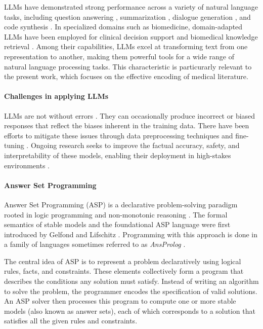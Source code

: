 \documentclass[11pt,leqno]{amsart}
\begin{document}

LLMs have demonstrated strong performance across a variety of natural language tasks, 
including question answering \cite{Brown2020}, summarization \cite{Zhang2020}, 
dialogue generation \cite{Thoppilan2022lamda}, and code synthesis \cite{Chen2021}. 
In specialized domains such as biomedicine, domain-adapted LLMs have been employed 
for clinical decision support \cite{Singhal2023} and 
biomedical knowledge retrieval \cite{Luo2022}.
Among their capabilities, LLMs excel at transforming text from one representation to another, 
making them powerful tools for a wide range of natural language processing tasks. 
This characteristic is particurarly relevant to the present work, 
which focuses on the effective encoding of medical literature. \\

\paragraph{\textbf{Challenges in applying LLMs}}

LLMs are not without errors \cite{Raj2023, Ruis2023}. 
They can occasionally produce incorrect or biased responses 
that reflect the biases inherent in the training data. 
There have been efforts to mitigate these issues 
through data preprocessing techniques and fine-tuning \cite{Dodge2021}.
Ongoing research seeks to improve the factual accuracy, safety, and interpretability 
of these models, enabling their deployment in high-stakes environments \cite{Ganguli2022}. \\

\paragraph{\textbf{Answer Set Programming}}

Answer Set Programming (ASP) \cite{Eiter2009} is a declarative problem-solving paradigm 
rooted in logic programming and non-monotonic reasoning \cite{Brewka2011}. 
The formal semantics of stable models and the foundational ASP language 
were first introduced by Gelfond and Lifschitz \cite{Gelfond2000, gel88}.
Programming with this approach is done in a family of languages 
sometimes referred to as \textit{AnsProlog} \cite{Gelfond2002}.

The central idea of ASP is to represent a problem 
declaratively using logical rules, facts, and constraints. 
These elements collectively form a program that describes the conditions any solution must satisfy. 
Instead of writing an algorithm to solve the problem, 
the programmer encodes the specification of valid solutions. 
An ASP solver then processes this program to compute one or more stable models (also known as answer sets),
each of which corresponds to a solution that satisfies all the given rules and constraints.
\end{document}
